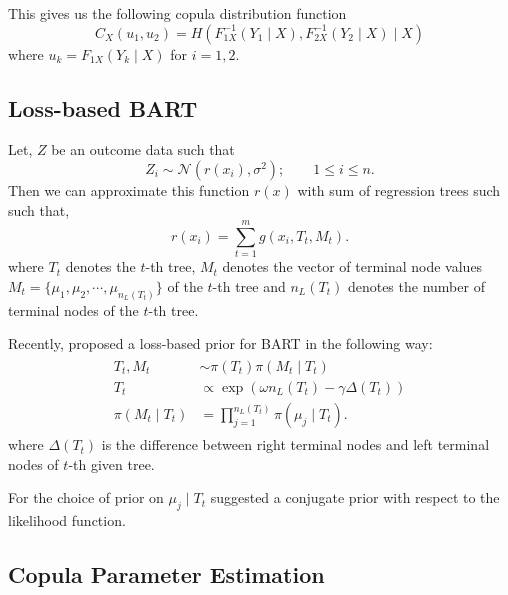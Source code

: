 \documentclass{amsart}
\begin{document}
This gives us the following copula distribution function
\begin{equation*}
	C_X(u_1,u_2) = H\left(F_{1X}^{-1}(Y_1\mid X),F_{2X}^{-1}(Y_2\mid X)\mid X\right)
\end{equation*}
where $u_k = F_{1X}(Y_k\mid X)$ for $i=1,2$.

\subsection{Loss-based BART}

Let, $Z$ be an outcome data such that 
\begin{equation*}
	Z_i \sim \mathcal{N}\left(r(x_i),\sigma^2\right);\qquad 1\le i\le n.
\end{equation*}
Then we can approximate this function $r(x)$ with sum of regression trees such such that,
\begin{equation*}
	r(x_i) = \sum_{t=1}^m g(x_i, T_t, M_t).
\end{equation*}
where $T_t$ denotes the $t$-th tree, $M_t$ denotes the vector of terminal node values $M_t = \{\mu_1,\mu_2, \cdots, \mu_{n_L(T_t)}\}$ of the $t$-th tree and $n_L(T_t)$ denotes the number of terminal nodes of the $t$-th tree. 

Recently, \citet{serafini2024lossbasedpriortreetopologies} proposed a loss-based prior for BART in the following way:
\begin{align}
	\begin{split}
		T_t, M_t &\sim \pi(T_t)\pi(M_t\mid T_t)\\
		T_t &\propto \exp\left(\omega n_L(T_t)-\gamma\Delta(T_t)\right)\\
		\pi(M_t\mid T_t) & = \prod_{j=1}^{n_L(T_t)}\pi(\mu_j\mid T_t).
	\end{split}
\end{align}
where $\Delta(T_t)$ is the difference between right terminal nodes and left terminal nodes of $t$-th given tree.

For the choice of prior on $\mu_j\mid T_t$ \citet{chipman_BART,serafini2024lossbasedpriortreetopologies} suggested a conjugate prior with respect to the likelihood function. 

\subsection{Copula Parameter Estimation}
\end{document}
